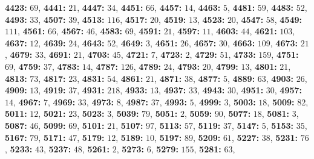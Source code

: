 \textsf{\bfseries 4423:} $69$, \textsf{\bfseries 4441:} $21$, \textsf{\bfseries 4447:} $34$, \textsf{\bfseries 4451:} $66$, \textsf{\bfseries 4457:} $14$, \textsf{\bfseries 4463:} $5$, \textsf{\bfseries 4481:} $59$, \textsf{\bfseries 4483:} $52$, \textsf{\bfseries 4493:} $33$, \textsf{\bfseries 4507:} $39$, \textsf{\bfseries 4513:} $116$, \textsf{\bfseries 4517:} $20$, \textsf{\bfseries 4519:} $13$, \textsf{\bfseries 4523:} $20$, \textsf{\bfseries 4547:} $58$, \textsf{\bfseries 4549:} $111$, \textsf{\bfseries 4561:} $66$, \textsf{\bfseries 4567:} $46$, \textsf{\bfseries 4583:} $69$, \textsf{\bfseries 4591:} $21$, \textsf{\bfseries 4597:} $11$, \textsf{\bfseries 4603:} $44$, \textsf{\bfseries 4621:} $103$, \textsf{\bfseries 4637:} $12$, \textsf{\bfseries 4639:} $24$, \textsf{\bfseries 4643:} $52$, \textsf{\bfseries 4649:} $3$, \textsf{\bfseries 4651:} $26$, \textsf{\bfseries 4657:} $30$, \textsf{\bfseries 4663:} $109$, \textsf{\bfseries 4673:} $21$, \textsf{\bfseries 4679:} $33$, \textsf{\bfseries 4691:} $21$, \textsf{\bfseries 4703:} $45$, \textsf{\bfseries 4721:} $7$, \textsf{\bfseries 4723:} $2$, \textsf{\bfseries 4729:} $51$, \textsf{\bfseries 4733:} $159$, \textsf{\bfseries 4751:} $69$, \textsf{\bfseries 4759:} $37$, \textsf{\bfseries 4783:} $14$, \textsf{\bfseries 4787:} $126$, \textsf{\bfseries 4789:} $24$, \textsf{\bfseries 4793:} $20$, \textsf{\bfseries 4799:} $13$, \textsf{\bfseries 4801:} $21$, \textsf{\bfseries 4813:} $73$, \textsf{\bfseries 4817:} $23$, \textsf{\bfseries 4831:} $54$, \textsf{\bfseries 4861:} $21$, \textsf{\bfseries 4871:} $38$, \textsf{\bfseries 4877:} $5$, \textsf{\bfseries 4889:} $63$, \textsf{\bfseries 4903:} $26$, \textsf{\bfseries 4909:} $13$, \textsf{\bfseries 4919:} $37$, \textsf{\bfseries 4931:} $218$, \textsf{\bfseries 4933:} $13$, \textsf{\bfseries 4937:} $33$, \textsf{\bfseries 4943:} $30$, \textsf{\bfseries 4951:} $30$, \textsf{\bfseries 4957:} $14$, \textsf{\bfseries 4967:} $7$, \textsf{\bfseries 4969:} $33$, \textsf{\bfseries 4973:} $8$, \textsf{\bfseries 4987:} $37$, \textsf{\bfseries 4993:} $5$, \textsf{\bfseries 4999:} $3$, \textsf{\bfseries 5003:} $18$, \textsf{\bfseries 5009:} $82$, \textsf{\bfseries 5011:} $12$, \textsf{\bfseries 5021:} $23$, \textsf{\bfseries 5023:} $3$, \textsf{\bfseries 5039:} $79$, \textsf{\bfseries 5051:} $2$, \textsf{\bfseries 5059:} $90$, \textsf{\bfseries 5077:} $18$, \textsf{\bfseries 5081:} $3$, \textsf{\bfseries 5087:} $46$, \textsf{\bfseries 5099:} $69$, \textsf{\bfseries 5101:} $21$, \textsf{\bfseries 5107:} $97$, \textsf{\bfseries 5113:} $57$, \textsf{\bfseries 5119:} $37$, \textsf{\bfseries 5147:} $5$, \textsf{\bfseries 5153:} $35$, \textsf{\bfseries 5167:} $79$, \textsf{\bfseries 5171:} $47$, \textsf{\bfseries 5179:} $12$, \textsf{\bfseries 5189:} $10$, \textsf{\bfseries 5197:} $89$, \textsf{\bfseries 5209:} $61$, \textsf{\bfseries 5227:} $38$, \textsf{\bfseries 5231:} $76$, \textsf{\bfseries 5233:} $43$, \textsf{\bfseries 5237:} $48$, \textsf{\bfseries 5261:} $2$, \textsf{\bfseries 5273:} $6$, \textsf{\bfseries 5279:} $155$, \textsf{\bfseries 5281:} $63$, 
